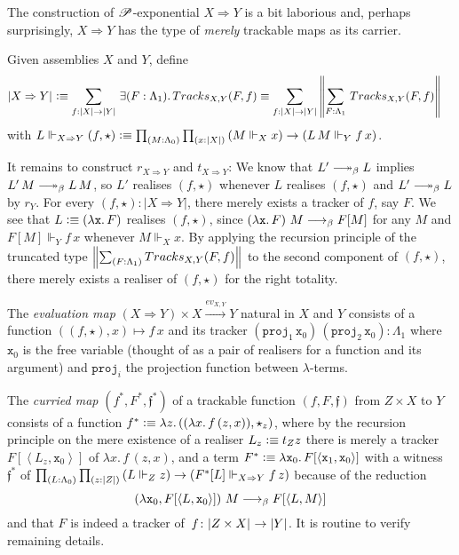 \documentclass[a4paper,UKenglish,numberwithinsect,cleveref,thm-restate]{lipics-v2021}
\numberwithin{equation}{section}
\theoremstyle{definition}
\theoremstyle{plain}
\begin{document}
The construction of $\PP$-exponential $X \Rightarrow Y$ is a bit laborious and, perhaps surprisingly, $X \Rightarrow Y$ has the type of \emph{merely} trackable maps as its carrier.
\begin{example}[$\PP$-Exponential]
  Given assemblies $X$ and $Y$, define
  \begin{align*}
    \bproj{X \Rightarrow Y} & \defeq \sm{f : |X| \to |Y|} \exis{F : \Lambda_1} \mathsf{Tracks}_{X, Y}(F, f) \equiv \sm{f : |X| \to |Y|} \brck{\sm{F : \Lambda_1} \mathsf{Tracks}_{X, Y}(F, f) }
  \end{align*}
  with $L \Vdash_{X \Rightarrow Y} (f, \star) \defeq \prd{M : \Lambda_0}{x : |X|} \left( M \Vdash_X x\right) \to \left(L\,M \Vdash_Y f\,x\right)$.

  It remains to construct $r_{X\Rightarrow Y}$ and $t_{X \Rightarrow Y}$: 
  We know that $L' \reduce L$ implies $L'\,M \reduce L\,M$, so $L'$ realises $(f, \star)$ whenever $L$ realises $(f, \star)$ and $L' \reduce L$ by $r_Y$.
  For every $(f, \star) : |X \Rightarrow Y|$, there merely exists a tracker of $f$, say $F$.
  We see that $L \vcentcolon\equiv \left(\mathtt{\lambda x}.\,F\right)$ realises $(f, \star)$, since
  $\left(\mathtt{\lambda x}.\,F\right)\,M \longrightarrow_{\beta} F[M]$ for any $M$ and $F[M] \Vdash_Y f\,x$ whenever $M \Vdash_X x$.
  By applying the recursion principle of the truncated type $\brck{\sm{F : \Lambda_1} \mathsf{Tracks}_{X, Y}(F, f) }$ to the second component of $(f, \star)$, there merely exists a realiser of $(f, \star)$ for the right totality.

  The \emph{evaluation map} $(X \Rightarrow Y) \times X \xrightarrow{ev_{X, Y}} Y$ natural in $X$ and $Y$ consists of a function
  $((f, \star) , x) \mapsto f\,x$ and its tracker $(\mathtt{proj}_1\, \mathtt{x}_0)\,(\mathtt{proj}_2\, \mathtt{x}_0) : \Lambda_1$ where $\mathtt{x}_0$ is the free variable (thought of as a pair of realisers for a function and its argument) and $\mathtt{proj}_i$ the projection function between $\lambda$-terms.

  The \emph{curried map} $(f^*, F^*, \mathfrak{f}^*)$ of a trackable function $(f, F, \mathfrak{f})$ from $Z \times X$ to $Y$ consists of
    a function
      $f^* \vcentcolon\equiv \lambda z.\, ((\lambda x.\, f\,(z, x)) , \star_z)$, 
      where by the recursion principle on the mere existence of a realiser $L_z \vcentcolon\equiv t_Z z$ there is merely a tracker~$F[\left< L_z , \mathtt{x}_0 \right>]$ of $\lambda x.\, f\,(z, x)$, and
    a term $F^* \vcentcolon\equiv \lambda \mathtt{x}_0.\, F[ \left< \mathtt{x}_1, \mathtt{x}_0 \right> ]$ with 
    a witness $\mathfrak{f}^*$ of $\prd{L : \Lambda_0}{z : |Z|} \left(L \Vdash_Z z\right) \to \left(F^*[L] \Vdash_{X \Rightarrow Y} f\, z\right)$ because of the reduction
      \[
        \left(\lambda \mathtt{x}_0, F[\left< L , \mathtt{x}_0 \right>]\right)\,M \longrightarrow_{\beta} F[\left< L , M \right>]
      \]
      and that $F$ is indeed a tracker of~$f\colon \mathopen{}\left|Z \times X\right|_{}^{}\mathclose{} \to \mathopen{}\left|Y\right|_{}^{}\mathclose{}$. 
  It is routine to verify remaining details.
\end{example}
\end{document}
